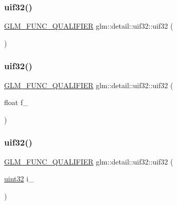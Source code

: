 \subsubsection{\texorpdfstring{uif32()}{uif32()}\hspace{0.1cm}{\footnotesize\ttfamily [1/3]}}
{\footnotesize\ttfamily \mbox{\hyperlink{setup_8hpp_a33fdea6f91c5f834105f7415e2a64407}{G\+L\+M\+\_\+\+F\+U\+N\+C\+\_\+\+Q\+U\+A\+L\+I\+F\+I\+ER}} glm\+::detail\+::uif32\+::uif32 (\begin{DoxyParamCaption}{ }\end{DoxyParamCaption})\hspace{0.3cm}{\ttfamily [inline]}}

\mbox{\label{unionglm_1_1detail_1_1uif32_a0d6e08c93b3d52c01e45864ff689c426}} 
\subsubsection{\texorpdfstring{uif32()}{uif32()}\hspace{0.1cm}{\footnotesize\ttfamily [2/3]}}
{\footnotesize\ttfamily \mbox{\hyperlink{setup_8hpp_a33fdea6f91c5f834105f7415e2a64407}{G\+L\+M\+\_\+\+F\+U\+N\+C\+\_\+\+Q\+U\+A\+L\+I\+F\+I\+ER}} glm\+::detail\+::uif32\+::uif32 (\begin{DoxyParamCaption}\item[{float}]{f\+\_\+ }\end{DoxyParamCaption})\hspace{0.3cm}{\ttfamily [inline]}}

\mbox{\label{unionglm_1_1detail_1_1uif32_aee424b46f48baa812572c015ec8bf434}} 
\subsubsection{\texorpdfstring{uif32()}{uif32()}\hspace{0.1cm}{\footnotesize\ttfamily [3/3]}}
{\footnotesize\ttfamily \mbox{\hyperlink{setup_8hpp_a33fdea6f91c5f834105f7415e2a64407}{G\+L\+M\+\_\+\+F\+U\+N\+C\+\_\+\+Q\+U\+A\+L\+I\+F\+I\+ER}} glm\+::detail\+::uif32\+::uif32 (\begin{DoxyParamCaption}\item[{\mbox{\hyperlink{namespaceglm_1_1detail_ade6cfbf377022aaa391af8cd50489222}{uint32}}}]{i\+\_\+ }\end{DoxyParamCaption})\hspace{0.3cm}{\ttfamily [inline]}}




